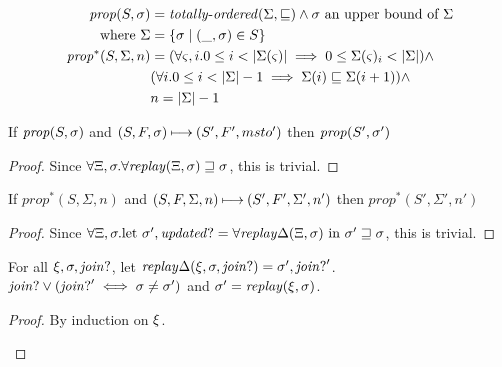 \documentclass{llncs}
\newcommand{\prop}{\mathit{prop}}
\begin{document}
\begin{align*}
\prop(S,\msto) &= \mathit{totally\text{-}ordered}(\Sigma, \sqsubseteq) \wedge \msto \text{ an upper bound of } \Sigma \\
 \text{ where } \Sigma &= \setof{\msto \mid (\_,\msto) \in S} \\
\prop^*(S,\Sigma,n) &= (\forall \mstate, i. 0 \le i < |\Sigma(\mstate)| \implies 0 \le \Sigma(\mstate)_i < |\Sigma|) \wedge \\
                  &(\forall i. 0 \le i < |\Sigma|-1 \implies \Sigma(i) \sqsubseteq \Sigma(i+1)) \wedge \\
                  &n = |\Sigma| - 1
\end{align*}

\begin{lemma}\label{monstore}
If $\prop(S,\msto)$ and $(S,F,\sigma) \mathbin{\longmapsto} (S',F',msto')$ then $\prop(S',\msto')$
\end{lemma}
\begin{proof}
Since $\forall \Xi,\sigma.\forall\mathit{replay}(\Xi,\sigma) \sqsupseteq \sigma$, this is trivial.
\end{proof}

\begin{lemma}\label{montime}
If $\prop^*(S,\Sigma,n)$ and $(S,F,\Sigma,n) \mathbin{\longmapsto} (S',F',\Sigma',n')$ then $\prop^*(S',\Sigma',n')$
\end{lemma}
\begin{proof}
Since $\forall \Xi,\sigma. \text{let } \sigma',\mathit{updated?} = \forall\mathit{replay}\Delta(\Xi,\sigma) \text{ in } \sigma' \sqsupseteq \sigma$,
this is trivial.
\end{proof}

\begin{lemma}
For all $\xi,\sigma,\mathit{join?}$, let $\mathit{replay}\Delta(\xi,\sigma,\mathit{join?}) = \sigma',\mathit{join?}'$.
$\mathit{join?} \vee (\mathit{join?}' \iff \sigma \neq \sigma')$ and $\sigma' = \mathit{replay}(\xi,\sigma)$.
\end{lemma}
\begin{proof}
By induction on $\xi$.
\begin{byCases}
\end{byCases}
\end{proof}
\end{document}
